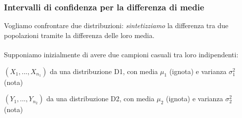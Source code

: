 \subsubsection{Intervalli di confidenza per la differenza di medie}

Vogliamo confrontare due distribuzioni: \textit{sintetizziamo} la differenza tra due popolazioni tramite la differenza delle loro media. \\ \\
Supponiamo inizialmente di avere due campioni casuali tra loro indipendenti: 

\noindent $(X_1,...,X_{n_1})$ da una distribuzione D1, con media $\mu_1$ (ignota) e varianza $\sigma_1^2$ (nota)

\noindent $(Y_1,...,Y_{n_2})$ da una distribuzione D2, con media $\mu_2$ (ignota) e varianza $\sigma_2^2$ (nota)

